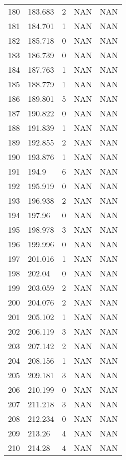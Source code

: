 \documentclass{article}
\begin{document}
\begin{longtable}{@{}lllll@{}}
				180 & 183.683 & 2     & NAN   & NAN   \\
				181 & 184.701 & 1     & NAN   & NAN   \\
				182 & 185.718 & 0     & NAN   & NAN   \\
				183 & 186.739 & 0     & NAN   & NAN   \\
				184 & 187.763 & 1     & NAN   & NAN   \\
				185 & 188.779 & 1     & NAN   & NAN   \\
				186 & 189.801 & 5     & NAN   & NAN   \\
				187 & 190.822 & 0     & NAN   & NAN   \\
				188 & 191.839 & 1     & NAN   & NAN   \\
				189 & 192.855 & 2     & NAN   & NAN   \\
				190 & 193.876 & 1     & NAN   & NAN   \\
				191 & 194.9   & 6     & NAN   & NAN   \\
				192 & 195.919 & 0     & NAN   & NAN   \\
				193 & 196.938 & 2     & NAN   & NAN   \\
				194 & 197.96  & 0     & NAN   & NAN   \\
				195 & 198.978 & 3     & NAN   & NAN   \\
				196 & 199.996 & 0     & NAN   & NAN   \\
				197 & 201.016 & 1     & NAN   & NAN   \\
				198 & 202.04  & 0     & NAN   & NAN   \\
				199 & 203.059 & 2     & NAN   & NAN   \\
				200 & 204.076 & 2     & NAN   & NAN   \\
				201 & 205.102 & 1     & NAN   & NAN   \\
				202 & 206.119 & 3     & NAN   & NAN   \\
				203 & 207.142 & 2     & NAN   & NAN   \\
				204 & 208.156 & 1     & NAN   & NAN   \\
				205 & 209.181 & 3     & NAN   & NAN   \\
				206 & 210.199 & 0     & NAN   & NAN   \\
				207 & 211.218 & 3     & NAN   & NAN   \\
				208 & 212.234 & 0     & NAN   & NAN   \\
				209 & 213.26  & 4     & NAN   & NAN   \\
				210 & 214.28  & 4     & NAN   & NAN   \\

\end{longtable}
\end{document}
